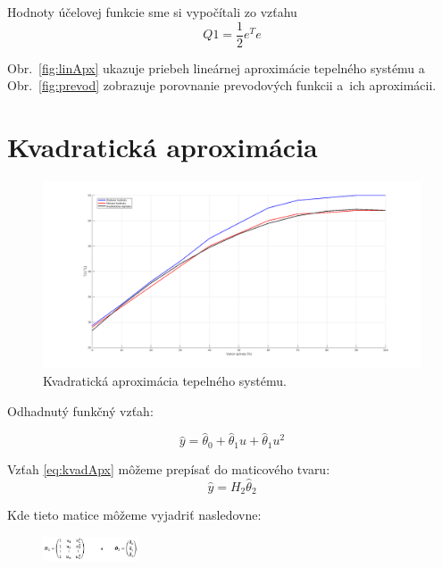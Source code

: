 \documentclass{article}
\begin{document}
Hodnoty účelovej funkcie sme si vypočítali zo vzťahu 
\begin{equation}
	Q1 = \frac{1}{2} e^Te
	\label{eq:objFunkcia}
\end{equation}

Obr.~\ref{fig:linApx} ukazuje priebeh lineárnej aproximácie tepelného systému a
Obr.~\ref{fig:prevod} zobrazuje porovnanie prevodových funkcii a~ich aproximácii.


\clearpage

\section{Kvadratická aproximácia}
\label{sec:kvad}

\begin{figure}[!htbp]
	\begin{center}
		\includegraphics[width=\textwidth]{include/kvadraticka_regresia.png}
	\end{center}
	\caption{Kvadratická aproximácia tepelného systému.}
	\label{fig:kvadApx}
\end{figure}

Odhadnutý funkčný vzťah:

\begin{equation}
	\hat{y} = \hat{\theta}_0 + \hat{\theta}_1u + \hat{\theta}_1u^2
	\label{eq:kvadApx}
\end{equation}

Vzťah \ref{eq:kvadApx} môžeme prepísať do maticového tvaru:
\begin{equation}
	\hat{y} = H_2\hat{\theta}_2
	\label{eq:kvadApx2}
\end{equation}

Kde tieto matice môžeme vyjadriť nasledovne:

\begin{figure}[!htbp]
	\begin{center}
		\includegraphics[width=0.25\textwidth]{include/defHandTheta2.png}
	\end{center}
\end{figure}
\end{document}
